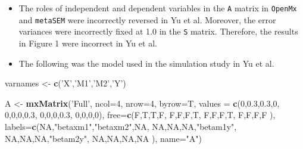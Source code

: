 \documentclass[]{article}
\newenvironment{Shaded}{\begin{snugshade}}{\end{snugshade}}
\newcommand{\KeywordTok}[1]{\textcolor[rgb]{0.13,0.29,0.53}{\textbf{#1}}}
\newcommand{\DataTypeTok}[1]{\textcolor[rgb]{0.13,0.29,0.53}{#1}}
\newcommand{\DecValTok}[1]{\textcolor[rgb]{0.00,0.00,0.81}{#1}}
\newcommand{\FloatTok}[1]{\textcolor[rgb]{0.00,0.00,0.81}{#1}}
\newcommand{\StringTok}[1]{\textcolor[rgb]{0.31,0.60,0.02}{#1}}
\newcommand{\OtherTok}[1]{\textcolor[rgb]{0.56,0.35,0.01}{#1}}
\newcommand{\NormalTok}[1]{#1}
\providecommand{\tightlist}{%
  \setlength{\itemsep}{0pt}\setlength{\parskip}{0pt}}
\begin{document}
\begin{itemize}
\tightlist
\item
  The roles of independent and dependent variables in the \texttt{A}
  matrix in \texttt{OpenMx} and \texttt{metaSEM} were incorrectly
  reversed in Yu et al. Moreover, the error variances were incorrectly
  fixed at 1.0 in the \texttt{S} matrix. Therefore, the results in
  Figure 1 were incorrect in Yu et al.
\item
  The following was the model used in the simulation study in Yu et al.
\end{itemize}

\begin{Shaded}
\begin{Highlighting}[]
\NormalTok{varnames <-}\StringTok{ }\KeywordTok{c}\NormalTok{(}\StringTok{'X'}\NormalTok{,}\StringTok{'M1'}\NormalTok{,}\StringTok{'M2'}\NormalTok{,}\StringTok{'Y'}\NormalTok{)}

\NormalTok{A <-}\StringTok{ }\KeywordTok{mxMatrix}\NormalTok{(}\StringTok{'Full'}\NormalTok{, }\DataTypeTok{ncol=}\DecValTok{4}\NormalTok{, }\DataTypeTok{nrow=}\DecValTok{4}\NormalTok{, }\DataTypeTok{byrow=}\NormalTok{T,}
              \DataTypeTok{values =} \KeywordTok{c}\NormalTok{(}\DecValTok{0}\NormalTok{,}\FloatTok{0.3}\NormalTok{,}\FloatTok{0.3}\NormalTok{,}\DecValTok{0}\NormalTok{,}
                         \DecValTok{0}\NormalTok{,}\DecValTok{0}\NormalTok{,}\DecValTok{0}\NormalTok{,}\FloatTok{0.3}\NormalTok{,}
                         \DecValTok{0}\NormalTok{,}\DecValTok{0}\NormalTok{,}\DecValTok{0}\NormalTok{,}\FloatTok{0.3}\NormalTok{,}
                         \DecValTok{0}\NormalTok{,}\DecValTok{0}\NormalTok{,}\DecValTok{0}\NormalTok{,}\DecValTok{0}\NormalTok{),}
              \DataTypeTok{free=}\KeywordTok{c}\NormalTok{(F,T,T,F,}
\NormalTok{                     F,F,F,T,}
\NormalTok{                     F,F,F,T,}
\NormalTok{                     F,F,F,F}
\NormalTok{              ),}
              \DataTypeTok{labels=}\KeywordTok{c}\NormalTok{(}\OtherTok{NA}\NormalTok{,}\StringTok{"betaxm1"}\NormalTok{,}\StringTok{"betaxm2"}\NormalTok{,}\OtherTok{NA}\NormalTok{,}
                       \OtherTok{NA}\NormalTok{,}\OtherTok{NA}\NormalTok{,}\OtherTok{NA}\NormalTok{,}\StringTok{"betam1y"}\NormalTok{,}
                       \OtherTok{NA}\NormalTok{,}\OtherTok{NA}\NormalTok{,}\OtherTok{NA}\NormalTok{,}\StringTok{"betam2y"}\NormalTok{,}
                       \OtherTok{NA}\NormalTok{,}\OtherTok{NA}\NormalTok{,}\OtherTok{NA}\NormalTok{,}\OtherTok{NA}
\NormalTok{              ),}
              \DataTypeTok{name=}\StringTok{"A"}\NormalTok{)}


\end{Highlighting}
\end{Shaded}
\end{document}
